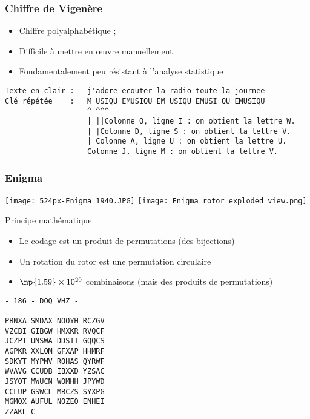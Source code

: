 \documentclass[french]{beamer}
\begin{document}
\begin{frame}
  \frametitle{Chiffre de Vigenère}
  \begin{block}{}
    \begin{itemize}
      \item Chiffre polyalphabétique ;
      \item Difficile à mettre en œuvre manuellement
      \item Fondamentalement peu résistant à l'analyse statistique
    \end{itemize}
  \end{block}
  \framebreak
  \begin{block}{}
    \scriptsize
    \begin{verbatim}
Texte en clair :   j'adore ecouter la radio toute la journee
Clé répétée    :   M USIQU EMUSIQU EM USIQU EMUSI QU EMUSIQU
                   ^ ^^^
                   | ||Colonne O, ligne I : on obtient la lettre W.
                   | |Colonne D, ligne S : on obtient la lettre V.
                   | Colonne A, ligne U : on obtient la lettre U.
                   Colonne J, ligne M : on obtient la lettre V.
    \end{verbatim}
  \normalsize
  \end{block}
\end{frame}

\begin{frame}
  \frametitle{Enigma}
  \begin{multicols}{2}
    \texttt{[image: 524px-Enigma\_1940.JPG]}
    \texttt{[image: Enigma\_rotor\_exploded\_view.png]}
  \end{multicols}
  \begin{multicols}{2}
    \begin{block}{Principe mathématique}
      \begin{itemize}
        \item Le codage est un produit de permutations (des bijections)
        \item Un rotation du rotor est une permutation circulaire
        \item $\np{1.59}\times 10^{20}$ combinaisons (mais des produits
          de permutations)
      \end{itemize}
    \end{block}
    \begin{block}{}
      \begin{verbatim}
- 186 - DOQ VHZ -

PBNXA SMDAX NOOYH RCZGV
VZCBI GIBGW HMXKR RVQCF
JCZPT UNSWA DDSTI GQQCS
AGPKR XXLOM GFXAP HHMRF
SDKYT MYPMV ROHAS QYRWF
WVAVG CCUDB IBXXD YZSAC
JSYOT MWUCN WOMHH JPYWD
CCLUP GSWCL MBCZS SYXPG
MGMQX AUFUL NOZEQ ENHEI
ZZAKL C
\end{verbatim}
    \end{block}
  \end{multicols}
\end{frame}
\end{document}
